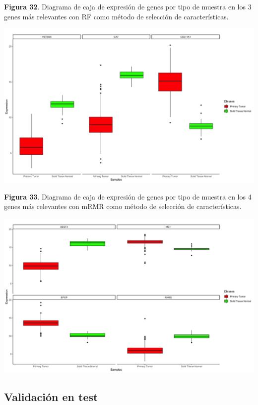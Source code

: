 \begin{center}
\textbf{Figura 32}. Diagrama de caja de expresión de genes por tipo de muestra en los 3 genes más relevantes con RF como método de selección de características.
\end{center}
\begin{center}
	\includegraphics[width=1\textwidth]{figuras/32_cr_biclase_43_knn_boxplots_mejor_metodo.png} 
\end{center}

\newpage
\begin{center}
\textbf{Figura 33}. Diagrama de caja de expresión de genes por tipo de muestra en los 4 genes más relevantes con mRMR como método de selección de características.
\end{center}
\begin{center}
	\includegraphics[width=1\textwidth]{figuras/33_cr_biclase_30_rf_boxplots_mejor_metodo.png} 
\end{center}

\subsection{Validación en test}

